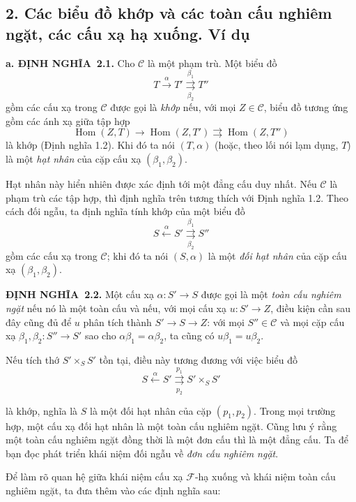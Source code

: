 \documentclass[11pt,twoside,openany]{book}
\numberwithin{equation}{section}
\newcommand{\src}[1]{%
  \phantomsection\hypertarget{src:\fgasourceid:#1}{}%
  \marginpar{\raggedleft\footnotesize\sffamily #1}%
}
\newcommand{\fgasourceid}{unset}
\newcommand{\result}[2]{\par\medskip\noindent\textbf{#1\if\relax\detokenize{#2}\relax\else\ #2\fi.}\quad}
\begin{document}
\subsection*{2. Các biểu đồ khớp và các toàn cấu nghiêm ngặt, các cấu xạ
hạ xuống. Ví dụ}

\result{a. ĐỊNH NGHĨA}{2.1} Cho $\mathcal C$ là một phạm trù. Một biểu đồ
\[
  T\xrightarrow{\alpha}T'
  \overset{\beta_1}{\underset{\beta_2}{\rightrightarrows}}T''
\]
gồm các cấu xạ trong $\mathcal C$ được gọi là \emph{khớp} nếu, với mọi
$Z\in\mathcal C$, biểu đồ tương ứng gồm các ánh xạ giữa tập hợp
\[
  \operatorname{Hom}(Z,T)\longrightarrow
  \operatorname{Hom}(Z,T')
  \rightrightarrows\operatorname{Hom}(Z,T'')
\]
là khớp (Định nghĩa 1.2). Khi đó ta nói $(T,\alpha)$ (hoặc, theo lối nói lạm
dụng, $T$) là một \emph{hạt nhân} của cặp cấu xạ
$(\beta_1,\beta_2)$.

Hạt nhân này hiển nhiên được xác định tới một đẳng cấu duy nhất. Nếu
$\mathcal C$ là phạm trù các tập hợp, thì định nghĩa trên tương thích với Định
nghĩa 1.2. Theo cách đối ngẫu, ta định nghĩa tính khớp của một biểu đồ
\[
  S\xleftarrow{\alpha}S'
  \overset{\beta_1}{\underset{\beta_2}{\rightrightarrows}}S''
\]
gồm các cấu xạ trong $\mathcal C$; khi đó ta nói $(S,\alpha)$ là một
\emph{đối hạt nhân} của cặp cấu xạ $(\beta_1,\beta_2)$.

\result{ĐỊNH NGHĨA}{2.2} Một cấu xạ $\alpha:S'\longrightarrow S$ được gọi là
một \emph{toàn cấu nghiêm ngặt} nếu nó là một toàn cấu và nếu, với mọi cấu xạ
$u:S'\longrightarrow Z$, điều kiện cần sau đây cũng đủ để $u$ phân tích thành
$S'\longrightarrow S\longrightarrow Z$: với mọi $S''\in\mathcal C$ và mọi
cặp cấu xạ $\beta_1,\beta_2:S''\longrightarrow S'$ sao cho
$\alpha\beta_1=\alpha\beta_2$, ta cũng có $u\beta_1=u\beta_2$.

Nếu tích thớ $S'\times_S S'$ tồn tại, điều này tương đương với việc biểu đồ
\[
  S\xleftarrow{\alpha}S'
  \overset{p_1}{\underset{p_2}{\rightrightarrows}}S'\times_S S'
\]

\src{305}
là khớp, nghĩa là $S$ là một đối hạt nhân của cặp $(p_1,p_2)$. Trong mọi
trường hợp, một cấu xạ đối hạt nhân là một toàn cấu nghiêm ngặt. Cũng lưu ý
rằng một toàn cấu nghiêm ngặt đồng thời là một đơn cấu thì là một đẳng cấu.
Ta để bạn đọc phát triển khái niệm đối ngẫu về \emph{đơn cấu nghiêm ngặt}.

Để làm rõ quan hệ giữa khái niệm cấu xạ $\mathcal F$-hạ xuống và khái niệm
toàn cấu nghiêm ngặt, ta đưa thêm vào các định nghĩa sau:
\end{document}
